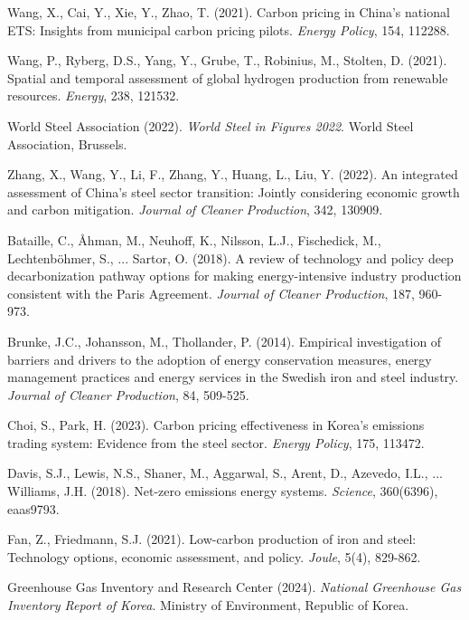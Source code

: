 \documentclass[preprint,1p,authoryear]{elsarticle}
\begin{document}
\begin{thebibliography}{99}
 Wang, X., Cai, Y., Xie, Y., Zhao, T. (2021). Carbon pricing in China's national ETS: Insights from municipal carbon pricing pilots. \textit{Energy Policy}, 154, 112288.

 Wang, P., Ryberg, D.S., Yang, Y., Grube, T., Robinius, M., Stolten, D. (2021). Spatial and temporal assessment of global hydrogen production from renewable resources. \textit{Energy}, 238, 121532.

 World Steel Association (2022). \textit{World Steel in Figures 2022}. World Steel Association, Brussels.

 Zhang, X., Wang, Y., Li, F., Zhang, Y., Huang, L., Liu, Y. (2022). An integrated assessment of China's steel sector transition: Jointly considering economic growth and carbon mitigation. \textit{Journal of Cleaner Production}, 342, 130909.

 Bataille, C., Åhman, M., Neuhoff, K., Nilsson, L.J., Fischedick, M., Lechtenböhmer, S., ... Sartor, O. (2018). A review of technology and policy deep decarbonization pathway options for making energy-intensive industry production consistent with the Paris Agreement. \textit{Journal of Cleaner Production}, 187, 960-973.

 Brunke, J.C., Johansson, M., Thollander, P. (2014). Empirical investigation of barriers and drivers to the adoption of energy conservation measures, energy management practices and energy services in the Swedish iron and steel industry. \textit{Journal of Cleaner Production}, 84, 509-525.

 Choi, S., Park, H. (2023). Carbon pricing effectiveness in Korea's emissions trading system: Evidence from the steel sector. \textit{Energy Policy}, 175, 113472.

 Davis, S.J., Lewis, N.S., Shaner, M., Aggarwal, S., Arent, D., Azevedo, I.L., ... Williams, J.H. (2018). Net-zero emissions energy systems. \textit{Science}, 360(6396), eaas9793.

 Fan, Z., Friedmann, S.J. (2021). Low-carbon production of iron and steel: Technology options, economic assessment, and policy. \textit{Joule}, 5(4), 829-862.

 Greenhouse Gas Inventory and Research Center (2024). \textit{National Greenhouse Gas Inventory Report of Korea}. Ministry of Environment, Republic of Korea.


\end{thebibliography}
\end{document}
